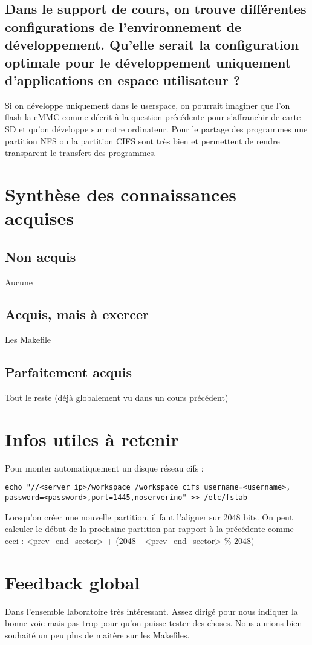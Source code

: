 \documentclass{ReportTemplate}
\begin{document}
\subsection{Dans le support de cours, on trouve différentes configurations de l’environnement de développement. Qu’elle serait la configuration optimale pour le développement uniquement d’applications en espace utilisateur ?}
Si on développe uniquement dans le userspace, on pourrait imaginer que l'on flash la eMMC comme décrit à la question précédente pour s'affranchir de carte SD et qu'on développe sur notre ordinateur.
Pour le partage des programmes une partition NFS ou la partition CIFS sont très bien et permettent de rendre transparent le transfert des programmes.

\section{Synthèse des connaissances acquises}
\subsection{Non acquis}
Aucune
\subsection{Acquis, mais à exercer}
Les Makefile
\subsection{Parfaitement acquis}
Tout le reste (déjà globalement vu dans un cours précédent)
\section{Infos utiles à retenir}
Pour monter automatiquement un disque réseau cifs : \newline
\begin{verbatim}
echo "//<server_ip>/workspace /workspace cifs username=<username>, password=<password>,port=1445,noserverino" >> /etc/fstab
\end{verbatim}
Lorsqu'on créer une nouvelle partition, il faut l'aligner sur 2048 bits. On peut calculer le début de la prochaine partition par rapport à la précédente comme ceci : \newline
<prev\_end\_sector> + (2048 - <prev\_end\_sector>  \% 2048)\newline
\section{Feedback global}
Dans l'ensemble laboratoire très intéressant. Assez dirigé pour nous indiquer la bonne voie mais pas trop pour qu'on puisse tester des choses.
Nous aurions bien souhaité un peu plus de maitère sur les Makefiles.
\end{document}
